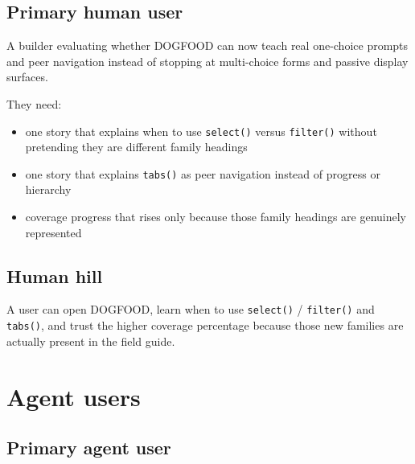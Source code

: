 \subsection{Primary human user}\label{record-072-primary-human-user}

A builder evaluating whether DOGFOOD can now teach real one-choice prompts and peer navigation instead of stopping at multi-choice forms and passive display surfaces.

They need:

\begin{itemize}
\tightlist
\item
  one story that explains when to use \texttt{s\allowbreak{}e\allowbreak{}l\allowbreak{}e\allowbreak{}c\allowbreak{}t\allowbreak{}(\allowbreak{})} versus \texttt{f\allowbreak{}i\allowbreak{}l\allowbreak{}t\allowbreak{}e\allowbreak{}r\allowbreak{}(\allowbreak{})} without pretending they are different family headings
\item
  one story that explains \texttt{t\allowbreak{}a\allowbreak{}b\allowbreak{}s\allowbreak{}(\allowbreak{})} as peer navigation instead of progress or hierarchy
\item
  coverage progress that rises only because those family headings are genuinely represented
\end{itemize}

\subsection{Human hill}\label{record-072-human-hill}

A user can open DOGFOOD, learn when to use \texttt{s\allowbreak{}e\allowbreak{}l\allowbreak{}e\allowbreak{}c\allowbreak{}t\allowbreak{}(\allowbreak{})} / \texttt{f\allowbreak{}i\allowbreak{}l\allowbreak{}t\allowbreak{}e\allowbreak{}r\allowbreak{}(\allowbreak{})} and \texttt{t\allowbreak{}a\allowbreak{}b\allowbreak{}s\allowbreak{}(\allowbreak{})}, and trust the higher coverage percentage because those new families are actually present in the field guide.

\section{Agent users}\label{record-072-agent-users}

\subsection{Primary agent user}\label{record-072-primary-agent-user}

